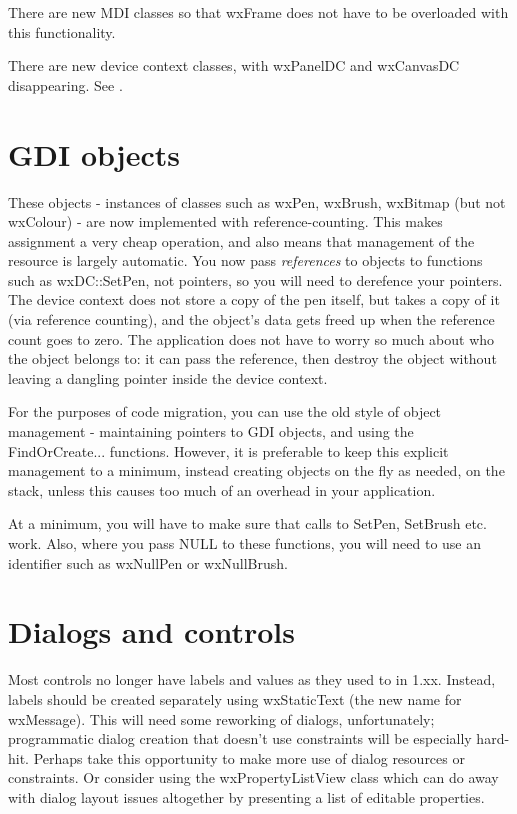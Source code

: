 There are new MDI classes so that wxFrame does not have to be overloaded with this
functionality.

There are new device context classes, with wxPanelDC and wxCanvasDC disappearing.
See .

\section{GDI objects}\label{portinggdiobjects}

These objects - instances of classes such as wxPen, wxBrush, wxBitmap (but not wxColour) -
are now implemented with reference-counting. This makes assignment a very cheap operation,
and also means that management of the resource is largely automatic. You now pass {\it references} to
objects to functions such as wxDC::SetPen, not pointers, so you will need to derefence your pointers.
The device context does not store a copy of the pen
itself, but takes a copy of it (via reference counting), and the object's data gets freed up
when the reference count goes to zero. The application does not have to worry so much about
who the object belongs to: it can pass the reference, then destroy the object without
leaving a dangling pointer inside the device context.

For the purposes of code migration, you can use the old style of object management - maintaining
pointers to GDI objects, and using the FindOrCreate... functions. However, it is preferable to
keep this explicit management to a minimum, instead creating objects on the fly as needed, on the stack,
unless this causes too much of an overhead in your application.

At a minimum, you will have to make sure that calls to SetPen, SetBrush etc. work. Also, where you pass NULL to these
functions, you will need to use an identifier such as wxNullPen or wxNullBrush.

\section{Dialogs and controls}\label{portingdialogscontrols}


Most controls no longer have labels and values as they used to in 1.xx. Instead, labels
should be created separately using wxStaticText (the new name for wxMessage). This will
need some reworking of dialogs, unfortunately; programmatic dialog creation that doesn't
use constraints will be especially hard-hit. Perhaps take this opportunity to make more
use of dialog resources or constraints. Or consider using the wxPropertyListView class
which can do away with dialog layout issues altogether by presenting a list of editable
properties.

